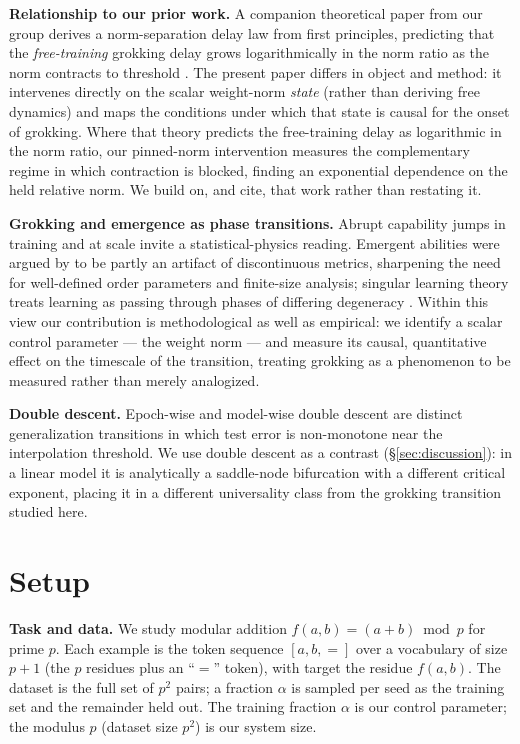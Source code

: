 \documentclass[10pt,twocolumn]{article}
\begin{document}
\textbf{Relationship to our prior work.}
A companion theoretical paper from our group derives a norm-separation delay law from first principles,
predicting that the \emph{free-training} grokking delay grows logarithmically in the norm ratio as the norm
contracts to threshold \citep{truong2026normsep}. The present paper differs in object and method: it
intervenes directly on the scalar weight-norm \emph{state} (rather than deriving free dynamics) and maps the
conditions under which that state is causal for the onset of grokking. Where that theory predicts the
free-training delay as logarithmic in the norm ratio, our pinned-norm
intervention measures the complementary regime in which contraction is blocked, finding an exponential
dependence on the held relative norm. We build on, and cite, that work rather than restating it.

\textbf{Grokking and emergence as phase transitions.}
Abrupt capability jumps in training and at scale invite a statistical-physics reading. Emergent abilities
\citep{wei2022emergent} were argued by \citet{schaeffer2023emergent} to be partly an artifact of
discontinuous metrics, sharpening the need for well-defined order parameters and finite-size analysis;
singular learning theory treats learning as passing through phases of differing degeneracy
\citep{watanabe2009algebraic}. Within this view our contribution is methodological as well as empirical: we
identify a scalar control parameter --- the weight norm --- and measure its causal, quantitative effect on
the timescale of the transition, treating grokking as a phenomenon to be measured rather than merely
analogized.

\textbf{Double descent.}
Epoch-wise and model-wise double descent \citep{belkin2019reconciling,nakkiran2021deep} are distinct
generalization transitions in which test error is non-monotone near the interpolation threshold. We use
double descent as a contrast (\S\ref{sec:discussion}): in a linear model it is analytically a saddle-node
bifurcation with a different critical exponent, placing it in a different universality class from the
grokking transition studied here.

\section{Setup}
\label{sec:setup}

\textbf{Task and data.} We study modular addition $f(a,b)=(a+b)\bmod p$ for prime $p$. Each example is the
token sequence $[a,b,{=}]$ over a vocabulary of size $p{+}1$ (the $p$ residues plus an ``$=$'' token), with
target the residue $f(a,b)$. The dataset is the full set of $p^2$ pairs; a fraction $\alpha$ is sampled per
seed as the training set and the remainder held out. The training fraction $\alpha$ is our control
parameter; the modulus $p$ (dataset size $p^2$) is our system size.
\end{document}
